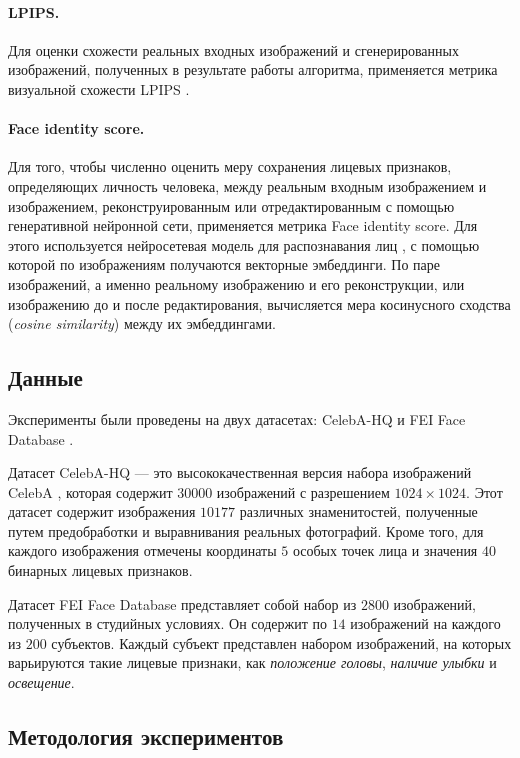 \paragraph{LPIPS.}
Для оценки схожести реальных входных изображений и сгенерированных изображений, полученных в результате работы алгоритма, применяется метрика визуальной схожести LPIPS \cite{zhang2018lpips}.

\paragraph{Face identity score.}
Для того, чтобы численно оценить меру сохранения лицевых признаков, определяющих личность человека, между реальным входным изображением и изображением, реконструированным или отредактированным с помощью генеративной нейронной сети, применяется метрика Face identity score.
Для этого используется нейросетевая модель для распознавания лиц \cite{deng2018arcface}, с помощью которой по изображениям получаются векторные эмбеддинги.
По паре изображений, а именно реальному изображению и его реконструкции, или изображению до и после редактирования, вычисляется мера косинусного сходства (\emph{cosine similarity}) между их эмбеддингами.


\subsection{Данные}
Эксперименты были проведены на двух датасетах: CelebA-HQ \cite{progressive-growing-gan} и FEI Face Database \cite{fei-database}.

Датасет CelebA-HQ --- это высококачественная версия набора изображений CelebA \cite{liu2015celeba}, которая содержит $30000$ изображений с разрешением $1024\times1024$.
Этот датасет содержит изображения $10177$ различных знаменитостей, полученные путем предобработки и выравнивания реальных фотографий.
Кроме того, для каждого изображения отмечены координаты $5$ особых точек лица и значения $40$ бинарных лицевых признаков.

Датасет FEI Face Database представляет собой набор из $2800$ изображений, полученных в студийных условиях.
Он содержит по $14$ изображений на каждого из $200$ субъектов.
Каждый субъект представлен набором изображений, на которых варьируются такие лицевые признаки, как \emph{положение головы}, \emph{наличие улыбки} и \emph{освещение}.


\subsection{Методология экспериментов}
